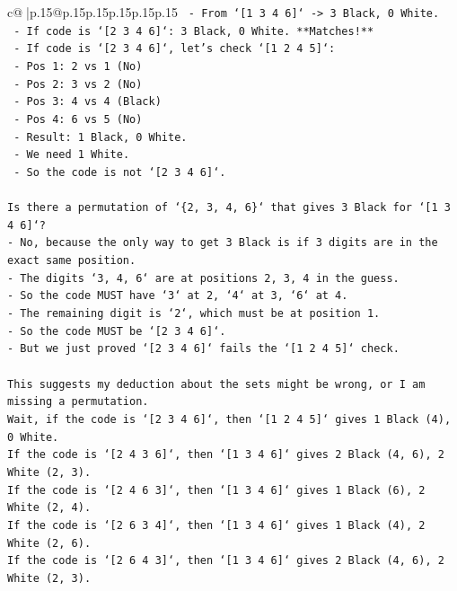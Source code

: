 \documentclass{article}
\begin{document}
{\begin{supertabular}{c@{$\;$}|p{.15\linewidth}@{}p{.15\linewidth}p{.15\linewidth}p{.15\linewidth}p{.15\linewidth}p{.15\linewidth}}
{{{\texttt{    {-} From `{[}1 3 4 6{]}` {-}> 3 Black, 0 White.} \\
\texttt{        {-} If code is `{[}2 3 4 6{]}`: 3 Black, 0 White. **Matches!**} \\
\texttt{        {-} If code is `{[}2 3 4 6{]}`, let's check `{[}1 2 4 5{]}`:} \\
\texttt{            {-} Pos 1: 2 vs 1 (No)} \\
\texttt{            {-} Pos 2: 3 vs 2 (No)} \\
\texttt{            {-} Pos 3: 4 vs 4 (Black)} \\
\texttt{            {-} Pos 4: 6 vs 5 (No)} \\
\texttt{            {-} Result: 1 Black, 0 White.} \\
\texttt{        {-} We need 1 White.} \\
\texttt{        {-} So the code is not `{[}2 3 4 6{]}`.} \\
\\ 
\texttt{Is there a permutation of `\{2, 3, 4, 6\}` that gives 3 Black for `{[}1 3 4 6{]}`?} \\
\texttt{{-} No, because the only way to get 3 Black is if 3 digits are in the exact same position.} \\
\texttt{{-} The digits `3, 4, 6` are at positions 2, 3, 4 in the guess.} \\
\texttt{{-} So the code MUST have `3` at 2, `4` at 3, `6` at 4.} \\
\texttt{{-} The remaining digit is `2`, which must be at position 1.} \\
\texttt{{-} So the code MUST be `{[}2 3 4 6{]}`.} \\
\texttt{{-} But we just proved `{[}2 3 4 6{]}` fails the `{[}1 2 4 5{]}` check.} \\
\\ 
\texttt{This suggests my deduction about the sets might be wrong, or I am missing a permutation.} \\
\texttt{Wait, if the code is `{[}2 3 4 6{]}`, then `{[}1 2 4 5{]}` gives 1 Black (4), 0 White.} \\
\texttt{If the code is `{[}2 4 3 6{]}`, then `{[}1 3 4 6{]}` gives 2 Black (4, 6), 2 White (2, 3).} \\
\texttt{If the code is `{[}2 4 6 3{]}`, then `{[}1 3 4 6{]}` gives 1 Black (6), 2 White (2, 4).} \\
\texttt{If the code is `{[}2 6 3 4{]}`, then `{[}1 3 4 6{]}` gives 1 Black (4), 2 White (2, 6).} \\
\texttt{If the code is `{[}2 6 4 3{]}`, then `{[}1 3 4 6{]}` gives 2 Black (4, 6), 2 White (2, 3).} \\
}}}
\end{supertabular}}
\end{document}
